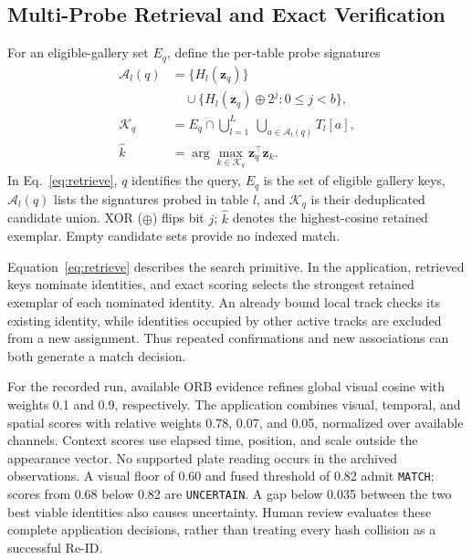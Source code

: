\documentclass[conference]{IEEEtran}
\begin{document}
\subsection{Multi-Probe Retrieval and Exact Verification}
For an eligible-gallery set $E_q$, define the per-table probe signatures
\begin{equation}
\begin{aligned}
\mathcal A_l(q)&=\{H_l(\mathbf z_q)\}\\
&\quad\cup\{H_l(\mathbf z_q)\oplus2^j:0\le j<b\},\\
\mathcal K_q&=E_q\cap\bigcup_{l=1}^{L}\ \bigcup_{a\in\mathcal A_l(q)}T_l[a],\\
\widehat k&=\arg\max_{k\in\mathcal K_q}\mathbf z_q^\top\mathbf z_k.
\end{aligned}
\label{eq:retrieve}
\end{equation}
In Eq.~\eqref{eq:retrieve}, $q$ identifies the query, $E_q$ is the set of eligible gallery keys, $\mathcal A_l(q)$ lists the signatures probed in table $l$, and $\mathcal K_q$ is their deduplicated candidate union. XOR ($\oplus$) flips bit $j$; $\widehat k$ denotes the highest-cosine retained exemplar. Empty candidate sets provide no indexed match.

Equation~\eqref{eq:retrieve} describes the search primitive. In the application, retrieved keys nominate identities, and exact scoring selects the strongest retained exemplar of each nominated identity. An already bound local track checks its existing identity, while identities occupied by other active tracks are excluded from a new assignment. Thus repeated confirmations and new associations can both generate a match decision.

For the recorded run, available ORB evidence refines global visual cosine with weights 0.1 and 0.9, respectively. The application combines visual, temporal, and spatial scores with relative weights 0.78, 0.07, and 0.05, normalized over available channels. Context scores use elapsed time, position, and scale outside the appearance vector. No supported plate reading occurs in the archived observations. A visual floor of 0.60 and fused threshold of 0.82 admit \texttt{MATCH}; scores from 0.68 below 0.82 are \texttt{UNCERTAIN}. A gap below 0.035 between the two best viable identities also causes uncertainty. Human review evaluates these complete application decisions, rather than treating every hash collision as a successful Re-ID.
\end{document}
